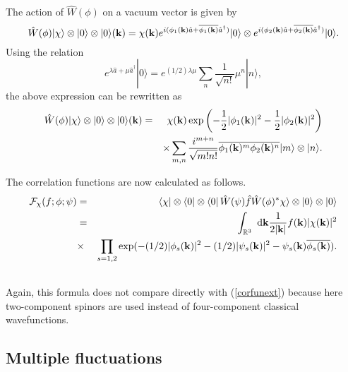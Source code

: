 \documentclass[12pt,a4paper]{article}
\def\Ro{{\mathbb R}}
\def\kk{{\bf k}}
\begin{document}
The action of $\hat W(\phi )$ on a vacuum vector is given by
\begin{equation}
\hat W(\phi )|\chi\rangle\otimes|0\rangle\otimes|0\rangle(\kk)
=\chi(\kk)
e^{i(\phi _1(\kk)\hat a+\overline{\phi _1(\kk)}\hat a^\dagger)}|0\rangle
\otimes
e^{i(\phi _2(\kk)\hat a+\overline{\phi _2(\kk)}\hat a^\dagger)}|0\rangle.
\end{equation}
Using the relation
\begin{equation}
e^{\lambda\hat a+\mu\hat a^\dagger}|0\rangle
=e^{(1/2)\lambda\mu}\sum_n\frac{1}{\sqrt{n!}}\mu^n|n\rangle,
\end{equation}
the above expression can be rewritten as
\begin{eqnarray}
\hat W(\phi )|\chi\rangle\otimes|0\rangle\otimes|0\rangle(\kk)
&=&\chi(\kk)
\exp\left(-\frac{1}{2}|\phi _1(\kk)|^2-\frac{1}{2}|\phi _2(\kk)|^2\right)\cr
& &\times
\sum_{m,n}\frac{i^{m+n}}{\sqrt{m!n!}}\overline{\phi _1(\kk)^m\phi _2(\kk)^n}
|m\rangle\otimes|n\rangle.
\end{eqnarray}

The correlation functions are now calculated as follows.
\begin{eqnarray}
{\cal F}_\chi(f;\phi;\psi)
&=&\langle\chi|\otimes\langle 0|\otimes\langle 0|
\,\hat W(\psi)\hat f\hat W(\phi)^*
\chi\rangle\otimes |0\rangle\otimes |0\rangle\cr
&=&\int_{\Ro^3}\hbox{ d}\kk\frac{1}{2|\kk|}f(\kk)|\chi(\kk)|^2\cr
&\times&\prod_{s=1,2}
\exp(-(1/2)|\phi_s(\kk)|^2-(1/2)|\psi_s(\kk)|^2-\psi_s(\kk)\overline{\phi_s(\kk)}).\cr
& &
\end{eqnarray}
Again, this formula does not compare directly with (\ref{corfunext})
because here two-component spinors are used instead of four-component classical wavefunctions.



\subsection{Multiple fluctuations}
\end{document}
